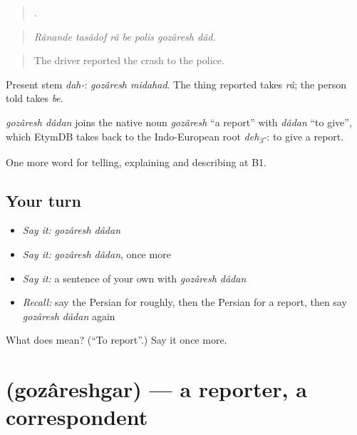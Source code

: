 \begin{quote}
      .
\end{quote}

\begin{quote}
\emph{Rânande tasâdof râ be polis gozâresh dâd.}
\end{quote}

\begin{quote}
The driver reported the crash to the police.
\end{quote}

Present stem \emph{dah-}: \emph{gozâresh midahad}. The thing reported takes \emph{râ}; the person told takes \emph{be}.

\begin{cousinweb}
\emph{gozâresh dâdan} joins the native noun \emph{gozâresh} \textquotedblleft{}a report\textquotedblright{} with \emph{dâdan} \textquotedblleft{}to give\textquotedblright{}, which EtymDB takes back to the Indo-European root \emph{deh\textsubscript{3}-}: to give a report.
\end{cousinweb}

\begin{grammarlens}[title={What you've built}]
One more word for telling, explaining and describing at B1.
\end{grammarlens}

\subsection*{Your turn}
\begin{itemize}
\raggedright
  \item \emph{Say it:} \emph{gozâresh dâdan}
  \item \emph{Say it:} \emph{gozâresh dâdan}, once more
  \item \emph{Say it:} a sentence of your own with \emph{gozâresh dâdan}
  \item \emph{Recall:} say the Persian for roughly, then the Persian for a report, then say \emph{gozâresh dâdan} again
\end{itemize}

\begin{tcolorbox}[breakable,colback=teal!4,colframe=teal!35!black,title={Before you move on}]
What does   mean? (\textquotedblleft{}To report\textquotedblright{}.) Say it once more.
\end{tcolorbox}
\section[\texorpdfstring{\fa{گزارشگر} (gozâreshgar)}{گزارشگر (gozâreshgar)}]{ (gozâreshgar) — a reporter, a correspondent}

